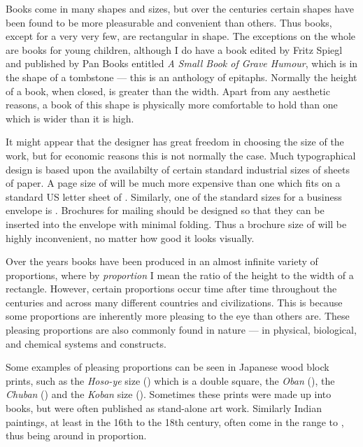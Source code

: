 \documentclass[10pt,letterpaper,extrafontsizes]{memoir}
\begin{document}
    Books come in many shapes and sizes, but over the centuries certain
shapes have been found to be more pleasurable and convenient than others.
Thus books, except for a very very few, are rectangular in shape. The 
exceptions on the whole are books for young children, although I do
have a book edited by Fritz Spiegl and published by Pan Books entitled
\textit{A Small Book of Grave Humour}, which is in the shape of a tombstone
--- this is an anthology of epitaphs. Normally the height of a book, when 
closed, is greater than the width. Apart from any aesthetic reasons, 
a book of this shape is physically more comfortable to hold than one which 
is wider than it is high.

    It might appear that the designer has great freedom in choosing the
size of the work, but for economic reasons this is not normally the case.
Much typographical design is based upon the availabilty of certain 
standard industrial sizes of sheets of paper. 
A page size of  will be much more expensive than one 
which fits on a standard
US letter sheet 
of . 
Similarly, one of the standard sizes
for a business envelope is . 
Brochures for mailing
should be designed so that they can be inserted into the envelope with 
minimal folding. Thus a brochure size of  will be 
highly inconvenient, no matter how good it looks visually.

    Over the years books have been produced in an almost infinite variety
of proportions,
where by \emph{proportion}
I mean the ratio of the height to the width of a
rectangle. However, certain proportions occur time after time throughout
the centuries and across many different countries and 
civilizations. This is because some proportions are inherently
more pleasing to the eye than others are. These pleasing proportions are
also commonly found in nature --- in  physical, biological, and chemical
systems and constructs. 


    Some examples of pleasing proportions can be
seen in Japanese wood block prints, such as the \textit{Hoso-ye} size
() which is a double square, the \textit{Oban} (), %
the \textit{Chuban} () and the \textit{Koban} size
(). Sometimes these prints were made up into books, but
were often published as stand-alone art work. Similarly Indian paintings,
at least in the 16th to the 18th century,
often come in the range  to , thus being around
 in proportion.
\end{document}
